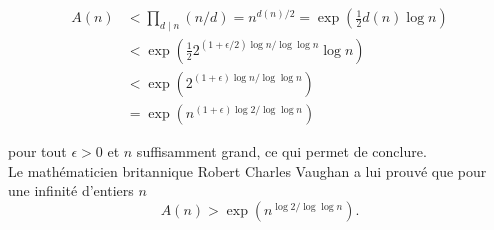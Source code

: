 \documentclass{article}
\theoremstyle{break}                  %
\begin{document}
\begin{align*}
	A(n) &< \prod_{d \mid n} (n/d) = n^{d(n)/2} = \exp\left(\frac{1}{2}d(n) \log n\right)\\
	&< \exp\left(\frac{1}{2}2^{(1+\epsilon/2)\log n/ \log \log n}\log n\right)\\
	&< \exp\left(2^{(1+\epsilon)\log n/ \log \log n}\right)\\
	&= \exp\left(n^{(1+\epsilon)\log 2/ \log \log n}\right)
\end{align*}

pour tout $\epsilon > 0$ et $n$ suffisamment grand, ce qui permet de conclure.\\

Le mathématicien britannique Robert Charles Vaughan a lui prouvé que pour une infinité d'entiers $n$
$$A(n) > \exp\left(n^{\log 2/ \log \log n}\right).$$
\end{document}
